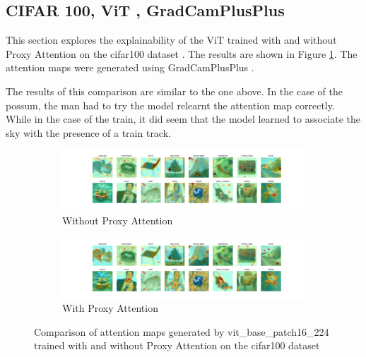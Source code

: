 \subsection{CIFAR 100, ViT , GradCamPlusPlus}
This section explores the explainability of the ViT \cite{dosovitskiyImageWorth16x162021} trained with and without Proxy Attention on the cifar100 dataset \cite{krizhevskyLearningMultipleLayers}. The results are shown in Figure \ref{fig:vit_cifar100}. The attention maps were generated using GradCamPlusPlus \cite{chattopadhayGradCAMGeneralizedGradientBased2018}.

The results of this comparison are similar to the one above. In the case of the possum, the man had to try the model relearnt the attention map correctly. While in the case of the train, it did seem that the model learned to associate the sky with the presence of a train track. 

\begin{figure}[!htb]
        \begin{subfigure}[b]{1\textwidth}
            \includegraphics[width=\linewidth]{images/cifar100_vit_base_patch16_224_noproxy_0.pdf}
            \caption{Without Proxy Attention}
        \end{subfigure}
        \begin{subfigure}[b]{1\textwidth}
            \includegraphics[width=\linewidth]{images/cifar100_vit_base_patch16_224_proxy_0.pdf}
            \caption{With Proxy Attention}
        \end{subfigure}
        \caption{Comparison of attention maps generated by vit\_base\_patch16\_224 trained with and without Proxy Attention on the cifar100 dataset}
        \label{fig:vit_cifar100}
    \end{figure}
    


